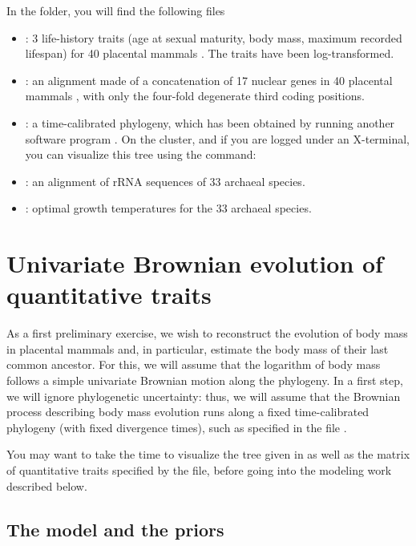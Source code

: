 In the  folder, you will find the following files
\begin{itemize}
\item
{}: 3 life-history traits (age at sexual maturity, body mass, maximum recorded lifespan) for 40 placental mammals \citep[taken from the Anage database,][]{deMagalhaes:2009p991}. The traits have been log-transformed.
\item
{}: an alignment made of a concatenation of 17 nuclear genes in 40 placental mammals \citep[from][]{Lartillot:2012be}, with only the four-fold degenerate third coding positions.
\item
{}: a time-calibrated phylogeny, which has been obtained by running another software program \citep[PhyloBayes,][]{Lartillot:2009p884}.
On the cluster, and if you are logged under an X-terminal, you can visualize this tree using the  command:
\\
\item
{}: an alignment of rRNA sequences of 33 archaeal species.
\item
{}: optimal growth temperatures for the 33 archaeal species.
\end{itemize}

\section{Univariate Brownian evolution of quantitative traits}

\label{univariate}

As a first preliminary exercise, we wish to reconstruct the evolution of body mass in placental mammals and, in particular, estimate the body mass of their last common ancestor.
For this, we will assume that the logarithm of body mass follows a simple univariate Brownian motion along the phylogeny.
In a first step, we will ignore phylogenetic uncertainty:
thus, we will assume that the Brownian process describing body mass evolution runs along a fixed time-calibrated phylogeny (with fixed divergence times), such as specified in the file .

You may want to take the time to visualize the tree given in  as well as the matrix of quantitative traits specified by the  file, before going into the modeling work described below.

\subsection{The model and the priors}

